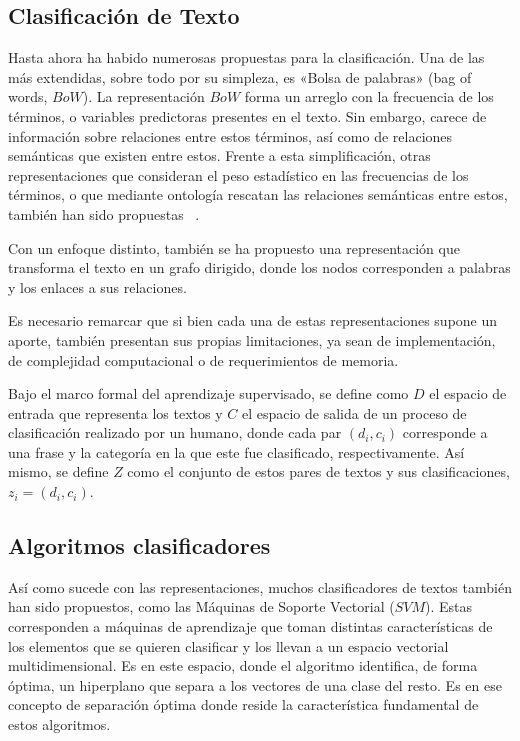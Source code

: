 \documentclass[sigconf]{acmart}
\begin{document}
\subsection{Clasificación de Texto}
Hasta ahora ha habido numerosas propuestas para la clasificación. Una de las más extendidas, sobre todo por su simpleza, es «Bolsa de palabras» (bag of words, $BoW$). La representación $BoW$ forma un arreglo con la frecuencia de los términos, o variables predictoras presentes en el texto. Sin embargo, carece de información sobre relaciones entre estos términos, así como de relaciones semánticas que existen entre estos. Frente a esta simplificación, otras representaciones que consideran el peso estadístico en las frecuencias de los términos, o que mediante ontología rescatan las relaciones semánticas entre estos, también han sido propuestas ~\cite{scielo}. 

Con un enfoque distinto, también se ha propuesto una representación que transforma el texto en un grafo dirigido, donde los nodos corresponden a palabras y los enlaces a sus relaciones.

Es necesario remarcar que si bien cada una de estas representaciones supone un aporte, también presentan sus propias limitaciones, ya sean de implementación, de complejidad computacional o de requerimientos de memoria.

Bajo el marco formal del aprendizaje supervisado, se define como $D$ el espacio de entrada que representa los textos y $C$ el espacio de salida de un proceso de clasificación realizado por un humano, donde cada par $(d_{i},c_{i})$ corresponde a una frase y la categoría en la que este fue clasificado, respectivamente. Así mismo, se define $Z$ como el conjunto de estos pares de textos y sus clasificaciones, $z_{i}=(d_{i}, c_{i})$.

\subsection{Algoritmos clasificadores}
Así como sucede con las representaciones, muchos clasificadores de textos también han sido propuestos, como las Máquinas de Soporte Vectorial ($SVM$). Estas corresponden a máquinas de aprendizaje que toman distintas características de los elementos que se quieren clasificar y los llevan a un espacio vectorial multidimensional. Es en este espacio, donde el algoritmo identifica, de forma óptima, un hiperplano que separa a los vectores de una clase del resto. Es en ese concepto de separación óptima donde reside la característica fundamental de estos algoritmos. 
\end{document}
